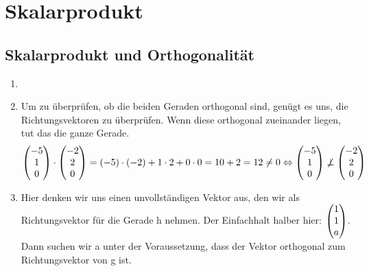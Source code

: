 \section{Skalarprodukt}
	\subsection{Skalarprodukt und Orthogonalität}	 
	\begin{enumerate}
 		\item \hfill
 		
 		\item Um zu überprüfen, ob die beiden Geraden orthogonal sind, genügt es uns, die Richtungsvektoren zu überprüfen. Wenn diese orthogonal zueinander liegen, tut das die ganze Gerade.
 		$$ \begin{pmatrix} -5 \\ 1 \\ 0 \end{pmatrix} \cdot \begin{pmatrix} -2 \\ 2 \\ 0 \end{pmatrix} = (-5)\cdot(-2)+1\cdot2+0\cdot0=10+2=12 \not = 0 \Leftrightarrow \begin{pmatrix} -5 \\ 1 \\ 0 \end{pmatrix} \not \perp \begin{pmatrix} -2 \\ 2 \\ 0 \end{pmatrix} $$ 		
 		
 		\item Hier denken wir uns einen unvollständigen Vektor aus, den wir als Richtungsvektor für die Gerade h nehmen. Der Einfachhalt halber hier: $\begin{pmatrix} 1 \\ 1 \\ a \end{pmatrix}$.
 		Dann suchen wir a unter der Voraussetzung, dass der Vektor orthogonal zum Richtungsvektor von g ist.
 			

\end{enumerate}
